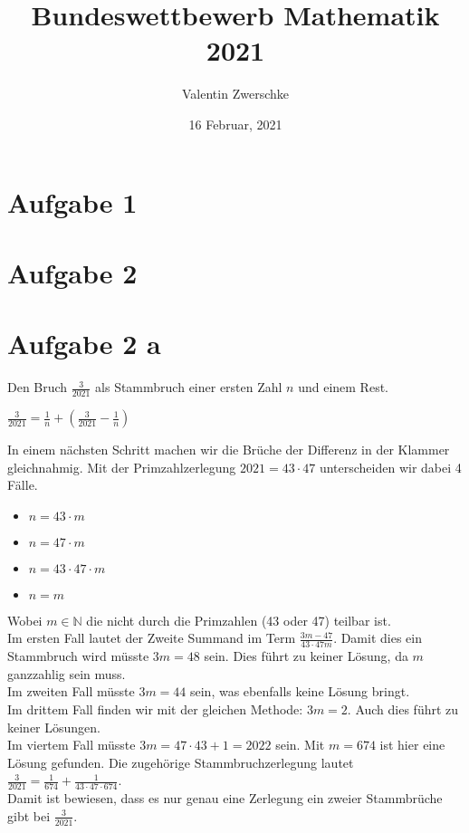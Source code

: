 \documentclass{article}
\title{Bundeswettbewerb Mathematik 2021}
\author{Valentin Zwerschke}
\date{16 Februar, 2021}
\begin{document}
\maketitle

\section*{Aufgabe 1}
\section*{Aufgabe 2}
\section*{Aufgabe 2 a}
Den Bruch $\frac{3}{2021}$ als Stammbruch einer ersten Zahl $n$ und einem Rest.
\begin{center}
    $\frac{3}{2021} = \frac{1}{n} + (\frac{3}{2021} - \frac{1}{n})$
\end{center}
In einem nächsten Schritt machen wir die Brüche der Differenz in der Klammer gleichnahmig. Mit der Primzahlzerlegung $2021 = 43 \cdot 47$ unterscheiden wir dabei 4 Fälle.
\begin{itemize}
    \item $n = 43 \cdot m$
    \item $n = 47 \cdot m$
    \item $n = 43 \cdot 47 \cdot m$
    \item $n = m$
\end{itemize}
Wobei \(m \in \mathbb{N}\) die nicht durch die Primzahlen (43 oder 47) teilbar ist.\\Im ersten Fall lautet der Zweite Summand im Term \(\frac{3m-47}{43 \cdot 47m}\). Damit dies ein Stammbruch wird müsste \(3m = 48\) sein. Dies führt zu keiner Lösung, da \(m\) ganzzahlig sein muss.\\Im zweiten Fall müsste \(3m = 44\) sein, was ebenfalls keine Lösung bringt.\\
Im drittem Fall finden wir mit der gleichen Methode: \(3m = 2\). Auch dies führt zu keiner Lösungen.\\
Im viertem Fall müsste \(3m = 47 \cdot 43 + 1 = 2022\) sein. Mit \(m = 674\) ist hier eine Lösung gefunden. Die zugehörige Stammbruchzerlegung lautet \(\frac{3}{2021} = \frac{1}{674} + \frac{1}{43 \cdot 47 \cdot 674}\).\\
Damit ist bewiesen, dass es nur genau eine Zerlegung ein zweier Stammbrüche gibt bei \(\frac{3}{2021}\).
\end{document}
